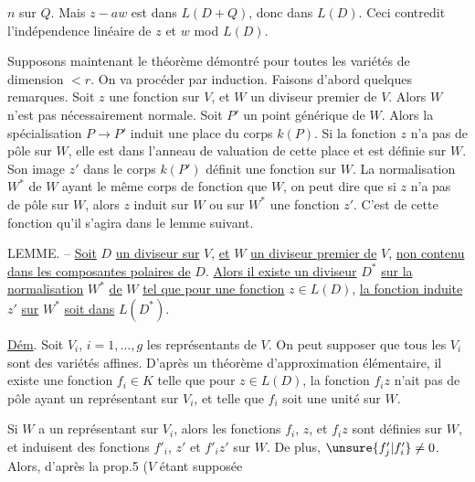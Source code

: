 $n$ sur $Q$. Mais $z-aw$ est dans $L(D+Q)$, donc dans $L(D)$. Ceci contredit l'indépendence linéaire de $z$ et $w$ mod $L(D)$.

Supposons maintenant le théorème démontré pour toutes les variétés de dimension $<r$. On va procéder par induction. Faisons d'abord quelques remarques. Soit $z$ une fonction sur $V$, et $W$ un diviseur premier de $V$. Alors $W$ n'est pas nécessairement normale. Soit $P'$ un point générique de $W$. Alors la spécialisation $P\longrightarrow P'$ induit une place du corps $k(P)$. Si la fonction $z$ n'a pas de pôle sur $W$, elle est dans l'anneau de valuation de cette place et est définie sur $W$. Son image $z'$ dans le corps $k(P')$ définit une fonction sur $W$. La normalisation $W^*$ de $W$ ayant le même corps de fonction que $W$, on peut dire que si $z$ n'a pas de pôle sur $W$, alors $z$ induit sur $W$ ou sur $W^*$ une fonction $z'$. C'est de cette fonction qu'il s'agira dans le lemme suivant.

LEMME. -- \uline{Soit} $D$ \uline{un diviseur sur} $V$, \uline{et} $W$ \uline{un diviseur premier de} $V$, \uline{non contenu dans les composantes polaires de} $D$. \uline{Alors il existe un diviseur} $D^*$ \uline{sur la normalisation} $W^*$ \uline{de} $W$ \uline{tel que pour une fonction} $z\in L(D)$, \uline{la fonction induite} $z'$ \uline{sur} $W^*$ \uline{soit dans} $L(D^*)$.

\uline{Dém}. Soit $V_i$, $i=1,\ldots,g$ les représentants de $V$. On peut supposer que tous les $V_i$ sont des variétés affines. D'après un théorème d'approximation élémentaire, il existe une fonction $f_i\in K$ telle que pour $z\in L(D)$, la fonction $f_i z$ n'ait pas de pôle ayant un représentant sur $V_i$, et telle que $f_i$ soit une unité sur $W$.

Si $W$ a un représentant sur $V_i$, alors les fonctions $f_i$, $z$, et $f_i z$ sont définies sur $W$, et induisent des fonctions $f'_i$, $z'$ et $f'_i z'$ sur $W$. De plus, $\unsure{f'_j|f'_i}\neq0$. Alors, d'après la prop.5 ($V$ étant supposée

